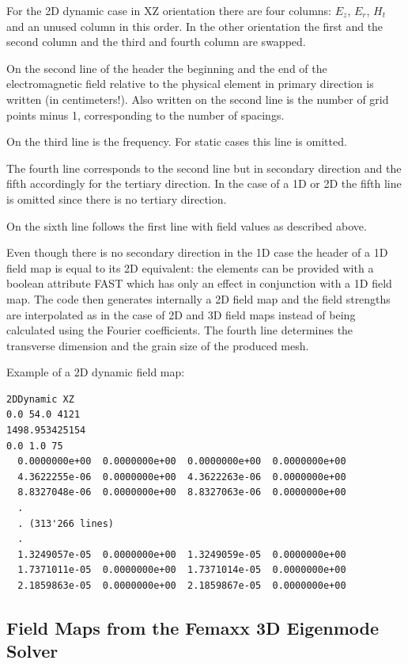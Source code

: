 For the 2D dynamic case in XZ orientation there are four columns: $E_z$, $E_r$, $H_t$ and an unused column in this order. In the other orientation the first and the second column and the third and fourth column are swapped.

On the second line of the header the beginning and the end of the electromagnetic field relative to the physical element in primary direction is written (in centimeters!). Also written on the second line is the number of grid points minus 1, corresponding to the number of spacings. 

On the third line is the frequency. For static cases this line is omitted.

The fourth line corresponds to the second line but in secondary direction and the fifth accordingly for the tertiary direction. In the case of a 1D or 2D the fifth line is omitted since there is no tertiary direction.

On the sixth line follows the first line with field values as described above.

Even though there is no secondary direction in the 1D case the header of a 1D field map is equal to its 2D equivalent: the elements can be provided with a boolean attribute FAST which has only an effect in conjunction with a 1D field map. The code then generates internally a 2D field map and the field strengths are interpolated as in the case of 2D and 3D field maps instead of being calculated using the Fourier coefficients. The fourth line determines the transverse dimension and the grain size of the produced mesh.

\noindent Example of a 2D dynamic field map:
\begin{verbatim}
2DDynamic XZ
0.0 54.0 4121
1498.953425154
0.0 1.0 75
  0.0000000e+00  0.0000000e+00  0.0000000e+00  0.0000000e+00
  4.3622255e-06  0.0000000e+00  4.3622263e-06  0.0000000e+00
  8.8327048e-06  0.0000000e+00  8.8327063e-06  0.0000000e+00
  .
  . (313'266 lines)
  .
  1.3249057e-05  0.0000000e+00  1.3249059e-05  0.0000000e+00
  1.7371011e-05  0.0000000e+00  1.7371014e-05  0.0000000e+00
  2.1859863e-05  0.0000000e+00  2.1859867e-05  0.0000000e+00
\end{verbatim}


\subsection{Field Maps from the Femaxx 3D Eigenmode Solver}


